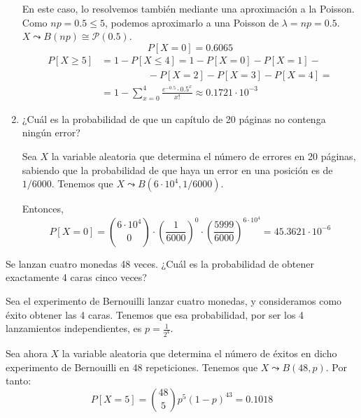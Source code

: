 \begin{ejercicio}
\begin{enumerate}
        En este caso, lo resolvemos también mediante una aproximación a la Poisson. Como $np=0.5\leq 5$, podemos aproximarlo a una Poisson de $\lambda=np=0.5$. $X\leadsto B(np)\cong \mathcal{P}(0.5)$.
        \begin{equation*}
            P[X=0]=0.6065
        \end{equation*}
        \begin{equation*}\begin{split}
            P[X\geq 5]
            &=1-P[X\leq 4]
            =1-P[X=0]-P[X=1]-\\ &\hspace{2cm}- P[X=2]-P[X=3]-P[X=4] =\\
            & = 1-\sum_{x=0}^4 \frac{e^{-0.5}\cdot 0.5^x}{x!} \approx 0.1721\cdot 10^{-3}
        \end{split}\end{equation*}
        
        \item ¿Cuál es la probabilidad de que un capítulo de 20 páginas no contenga ningún error?

        Sea $X$ la variable aleatoria que determina el número de errores en 20 páginas, sabiendo que la probabilidad de que haya un error en una posición es de $1/6000$. Tenemos que $X\leadsto B(6\cdot 10^4, 1/6000)$.

        Entonces,
        \begin{equation*}
            P[X=0] = \binom{6\cdot 10^4}{0}\cdot \left(\frac{1}{6000}\right)^0 \cdot \left(\frac{5999}{6000}\right)^{6\cdot 10^4}=45.3621\cdot 10^{-6}
        \end{equation*}
    \end{enumerate}
\end{ejercicio}



\begin{ejercicio}
    Se lanzan cuatro monedas 48 veces. ¿Cuál es la probabilidad de obtener exactamente 4 caras cinco veces?

    Sea el experimento de Bernouilli lanzar cuatro monedas, y consideramos como éxito obtener las 4 caras. Tenemos que esa probabilidad, por ser los 4 lanzamientos independientes, es $p=\frac{1}{2^4}$.
    
    Sea ahora $X$ la variable aleatoria que determina el número de éxitos en dicho experimento de Bernouilli en 48 repeticiones. Tenemos que $X\leadsto B(48, p)$. Por tanto:
    \begin{equation*}
        P[X=5]=\binom{48}{5}p^5(1-p)^{43}=0.1018
    \end{equation*}
\end{ejercicio}


